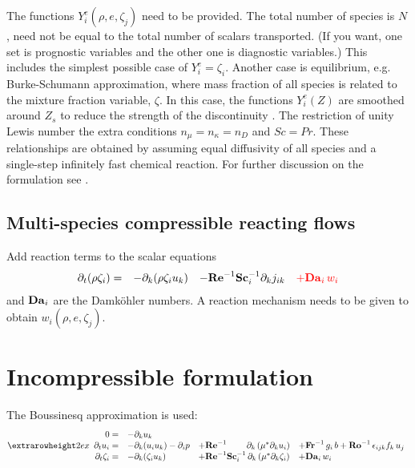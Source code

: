 The functions $Y_i^e(\rho,e,\zeta_j)$ need to be provided. The total number of
species is $N$, need not be equal to the total number of scalars
transported. (If you want, one set is prognostic variables and the other one is
diagnostic variables.) This includes the simplest possible case of $Y_i^e =
\zeta_i$. Another case is equilibrium, e.g. Burke-Schumann approximation, where
mass fraction of all species is related to the mixture fraction variable,
$\zeta$.  In this case, the functions $Y_i^e(Z)$ are smoothed around $Z_s$ to
reduce the strength of the discontinuity \citep{Higuera:1994}. The restriction
of unity Lewis number the extra conditions $n_\mu=n_\kappa=n_D$ and $Sc=Pr$.
These relationships are obtained by assuming equal diffusivity of all species
and a single-step infinitely fast chemical reaction.  For further discussion on
the formulation see \cite{Williams:1985}.

\subsection{Multi-species compressible reacting flows}

Add reaction terms to the scalar equations
\begin{equation}
\begin{array}{rlll}
  \partial_t (\rho \zeta_i)=&
  - \partial_k (\rho \zeta_i u_k) &
  - \mathrm{\bf Re}^{-1}\mathrm{\bf Sc}_i^{-1} \partial_k j_{ik} & \color{red}{+ \mathrm{\bf Da}_i\,w_i}
\end{array}
\end{equation}
and $\mathrm{\bf Da}_i$ are the Damk{\"o}hler numbers. A reaction mechanism
needs to be given to obtain $w_i(\rho,e,\zeta_j)$.

\section{Incompressible formulation}

The Boussinesq approximation is used:
\begin{equation}
\setlength{\extrarowheight}{2ex}
\begin{array}{rlll}
  0 =&
  -\partial_k u_k   & \\
  \partial_t  u_i =& 
  -\partial_k ( u_i u_k )-\partial_i p &
  +\mathrm{\bf Re}^{-1}\qquad\;\partial_k \left( \mu^{*} \partial_k u_i\right) &
  +\mathrm{\bf Fr}^{-1}\, g_i\,b+\mathrm{\bf Ro}^{-1}\,\epsilon_{ijk} f_k\,u_j  \\
  \partial_t \zeta_i =&
  -\partial_k (\zeta_i u_k) &
  + \mathrm{\bf Re}^{-1}\mathrm{\bf Sc}_i^{-1}\, \partial_k \left( \mu^{*}\partial_k\zeta_i\right) &+ \mathrm{\bf Da}_i\,w_i
\end{array}
\end{equation}

